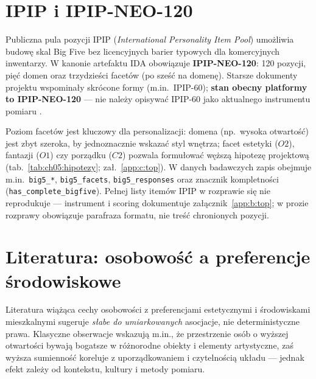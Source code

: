 \section{IPIP i IPIP-NEO-120}
\label{ch05:sec:ipip}

Publiczna pula pozycji IPIP (\emph{International Personality Item Pool}) umożliwia budowę skal Big Five bez licencyjnych barier typowych dla komercyjnych inwentarzy.
W kanonie artefaktu IDA obowiązuje \textbf{IPIP-NEO-120}: 120 pozycji, pięć domen oraz trzydzieści facetów (po sześć na domenę).
Starsze dokumenty projektu wspominały skrócone formy (m.in.\ IPIP-60); \textbf{stan obecny platformy to IPIP-NEO-120} --- nie należy opisywać IPIP-60 jako aktualnego instrumentu pomiaru \parencite{idaPlatform2026}.

Poziom facetów jest kluczowy dla personalizacji: domena (np.\ wysoka otwartość) jest zbyt szeroka, by jednoznacznie wskazać styl wnętrza; facet estetyki ($O2$), fantazji ($O1$) czy porządku ($C2$) pozwala formułować węższą hipotezę projektową (tab.~\ref{tab:ch05:hipotezy}; zał.~\ref{app:c:top}).
W danych badawczych zapis obejmuje m.in.\ \texttt{big5\_*}, \texttt{big5\_facets}, \texttt{big5\_responses} oraz znacznik kompletności (\texttt{has\_complete\_bigfive}).
Pełnej listy itemów IPIP w rozprawie się nie reprodukuje --- instrument i scoring dokumentuje załącznik~\ref{app:b:top}; w prozie rozprawy obowiązuje parafraza formatu, nie treść chronionych pozycji.

\section{Literatura: osobowość a preferencje środowiskowe}
\label{ch05:sec:literatura}

Literatura wiążąca cechy osobowości z preferencjami estetycznymi i środowiskami mieszkalnymi sugeruje \emph{słabe do umiarkowanych} asocjacje, nie deterministyczne prawa.
Klasyczne obserwacje wskazują m.in., że przestrzenie osób o wyższej otwartości bywają bogatsze w różnorodne obiekty i elementy artystyczne, zaś wyższa sumienność koreluje z uporządkowaniem i czytelnością układu --- jednak efekt zależy od kontekstu, kultury i metody pomiaru.

